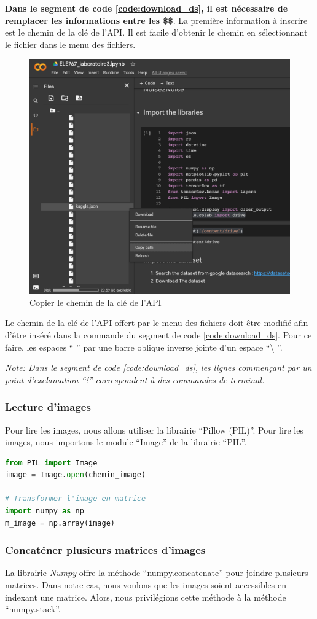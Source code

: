 \documentclass{article}
\begin{document}
\bigbreak
\textbf{Dans le segment de code \ref{code:download_ds}, il est nécessaire de remplacer les informations entre les \$\$}. La première information à inscrire est le chemin de la clé de l'API. Il est facile d'obtenir le chemin en sélectionnant le fichier dans le menu des fichiers.

\bigbreak
\begin{figure}[H]
  \centering
  \includegraphics[width=0.5\columnwidth]{figures/copy_path}
  \caption{Copier le chemin de la clé de l'API}
  \label{fig:copy_path}
\end{figure}

\bigbreak
Le chemin de la clé de l'API offert par le menu des fichiers doit être modifié afin d'être inséré dans la commande du segment de code \ref{code:download_ds}. Pour ce faire, les espaces `` '' par une barre oblique inverse jointe d'un espace ``\textbackslash{} ''.

\bigbreak
\textit{Note: Dans le segment de code \ref{code:download_ds}, les lignes commençant par un point d'exclamation ``!'' correspondent à des commandes de terminal.}

\subsubsection{Lecture d'images}
Pour lire les images, nous allons utiliser la librairie ``Pillow (PIL)''. Pour lire les images, nous importons le module ``Image'' de la librairie ``PIL''.

\bigbreak
\begin{lstlisting}[language=Python, caption={Ouverture d'une image avec PIL}, label={code:open_image}]
from PIL import Image
image = Image.open(chemin_image)

# Transformer l'image en matrice
import numpy as np
m_image = np.array(image)
\end{lstlisting}

\subsubsection{Concaténer plusieurs matrices d'images}
La librairie \textit{Numpy} offre la méthode ``numpy.concatenate'' pour joindre plusieurs matrices. Dans notre cas, nous voulons que les images soient accessibles en indexant une matrice. Alors, nous privilégions cette méthode à la méthode ``numpy.stack''.
\end{document}
